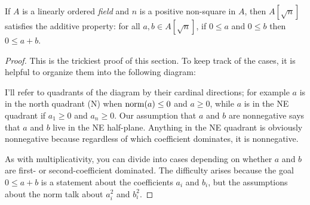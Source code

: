 \begin{lemma}[Additivity]
  \label{thm:additivity}
  \leanok
  If $A$ is a linearly ordered \emph{field} and $n$ is a positive non-square in $A$, then
  $A[\sqrt{n}]$ satisfies the additive property: for all $a, b ∈
  A[\sqrt{n}]$, if $0 \leq a$ and $0 \leq b$ then $0 \leq a + b$.
\end{lemma}
\begin{proof}
  \leanok
  This is the trickiest proof of this section. To keep track of the cases, it
  is helpful to organize them into the following diagram:

  \begin{center}
  \end{center}

  I'll refer to quadrants of the diagram by their cardinal directions; for
  example $a$ is in the north quadrant (N) when $\operatorname{norm}(a) \leq 0$ and $a \geq 0$,
  while $a$ is in the NE quadrant if $a_1 \geq 0$ and $a_n \geq 0$. Our
  assumption that $a$ and $b$ are nonnegative says that $a$ and $b$ live in the
  NE half-plane. Anything in the NE quadrant is obviously nonnegative because
  regardless of which coefficient dominates, it is nonnegative.

  As with multiplicativity, you can divide into cases depending on whether $a$
  and $b$ are first- or second-coefficient dominated. The difficulty arises
  because the goal $0 \leq a + b$ is a statement about the coefficients $a_i$
  and $b_i$, but the assumptions about the norm talk about $a_i^2$ and $b_i^2$.


\end{proof}
